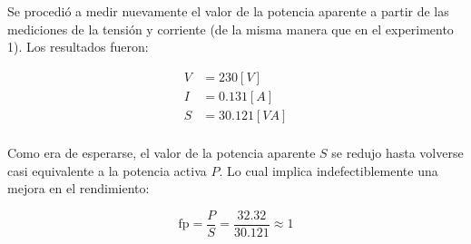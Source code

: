 Se procedió a medir nuevamente el valor de la potencia aparente a partir de las mediciones de la tensión y corriente (de la misma manera que en el experimento 1). Los resultados fueron:

\begin{align*}
    V &= 230 [V]\\
    I &= 0.131 [A]\\
    S &= 30.121 [VA] \\
\end{align*}


Como era de esperarse, el valor de la potencia aparente $S$ se redujo hasta volverse casi equivalente a la potencia activa $P$. Lo cual implica indefectiblemente una mejora en el rendimiento: 

\begin{equation*}
    \mathrm{fp} = \frac{P}{S} = \frac{32.32}{30.121} \approx 1
\end{equation*}